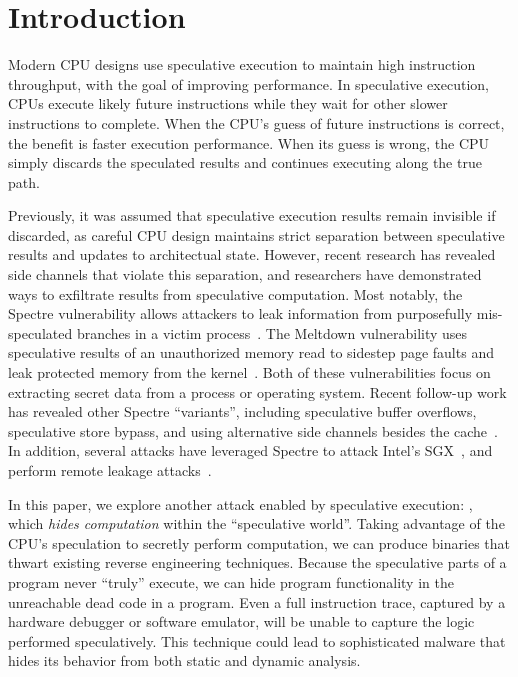 
\section{Introduction}


Modern CPU designs use speculative execution to maintain high instruction
throughput, with the goal of improving performance. In speculative execution,
CPUs execute likely future instructions while they wait for other slower
instructions to complete. When the CPU's guess of future instructions is correct, the
benefit is faster execution performance. When its guess is wrong, the CPU
simply discards the speculated results and continues executing along the true path.


Previously, it was assumed that speculative execution results remain invisible
if discarded, as careful CPU design maintains strict separation between
speculative results and updates to architectual state. However, recent research
has revealed side channels that violate this separation, and researchers have
demonstrated ways to exfiltrate results from speculative computation. Most
notably, the Spectre vulnerability allows attackers to leak information from
purposefully mis-speculated branches in a victim process~\cite{spectre}. The
Meltdown vulnerability uses speculative results of an unauthorized memory read
to sidestep page faults and leak protected memory from the
kernel~\cite{meltdown}. Both of these vulnerabilities focus on extracting secret
data from a process or operating system. Recent follow-up work has revealed
other Spectre ``variants'',  including speculative buffer overflows, speculative
store bypass, and using alternative side channels besides the
cache~\cite{kiriansky2018speculative, spectre_ng}. In addition, several attacks
have leveraged Spectre to attack Intel's SGX~\cite{chen2018sgxpectre,
spectre_sgx, foreshadow}, and perform remote leakage
attacks~\cite{schwarz2018netspectre}.

\medskip

In this paper, we explore another attack enabled by speculative execution:
\speculake, which \emph{hides computation} within
the ``speculative world''. Taking advantage of the CPU's speculation to secretly
perform computation,
we can produce binaries that thwart existing reverse engineering
techniques. Because the speculative parts of a program never ``truly'' execute,
we can hide program functionality in the unreachable dead code in a program.
Even a full instruction trace, captured by a hardware debugger or software
emulator, will be unable to capture the logic performed speculatively.
This technique could lead to sophisticated malware that hides its behavior
from both static and dynamic analysis.


